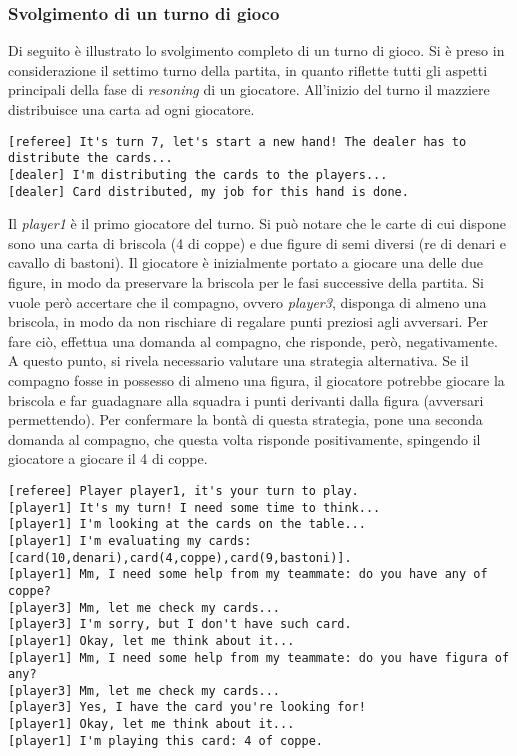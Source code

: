 \documentclass[a4paper,12pt]{article}
\begin{document}
\subsubsection{Svolgimento di un turno di gioco}
Di seguito è illustrato lo svolgimento completo di un turno di gioco. Si è preso in considerazione il settimo turno della partita, in quanto riflette tutti gli aspetti principali della fase di \emph{resoning} di un giocatore. All'inizio del turno il mazziere distribuisce una carta ad ogni giocatore.
\begin{Verbatim}
[referee] It's turn 7, let's start a new hand! The dealer has to distribute the cards...
[dealer] I'm distributing the cards to the players...
[dealer] Card distributed, my job for this hand is done.
\end{Verbatim}
Il \emph{player1} è il primo giocatore del turno. Si può notare che le carte di cui dispone sono una carta di briscola (4 di coppe) e due figure di semi diversi (re di denari e cavallo di bastoni). Il giocatore è inizialmente portato a giocare una delle due figure, in modo da preservare la briscola per le fasi successive della partita. Si vuole però accertare che il compagno, ovvero \emph{player3}, disponga di almeno una briscola, in modo da non rischiare di regalare punti preziosi agli avversari. Per fare ciò, effettua una domanda al compagno, che risponde, però, negativamente. A questo punto, si rivela necessario valutare una strategia alternativa. Se il compagno fosse in possesso di almeno una figura, il giocatore potrebbe giocare la briscola e far guadagnare alla squadra i punti derivanti dalla figura (avversari permettendo). Per confermare la bontà di questa strategia, pone una seconda domanda al compagno, che questa volta risponde positivamente, spingendo il giocatore a giocare il 4 di coppe.
\begin{Verbatim}
[referee] Player player1, it's your turn to play.
[player1] It's my turn! I need some time to think...
[player1] I'm looking at the cards on the table...
[player1] I'm evaluating my cards: [card(10,denari),card(4,coppe),card(9,bastoni)].
[player1] Mm, I need some help from my teammate: do you have any of coppe?
[player3] Mm, let me check my cards...
[player3] I'm sorry, but I don't have such card.
[player1] Okay, let me think about it...
[player1] Mm, I need some help from my teammate: do you have figura of any?
[player3] Mm, let me check my cards...
[player3] Yes, I have the card you're looking for!
[player1] Okay, let me think about it...
[player1] I'm playing this card: 4 of coppe.
\end{Verbatim}
\end{document}

